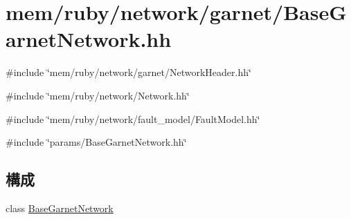 \hypertarget{BaseGarnetNetwork_8hh}{
\section{mem/ruby/network/garnet/BaseGarnetNetwork.hh}
\label{BaseGarnetNetwork_8hh}
}
{\ttfamily \#include \char`\"{}mem/ruby/network/garnet/NetworkHeader.hh\char`\"{}}\par
{\ttfamily \#include \char`\"{}mem/ruby/network/Network.hh\char`\"{}}\par
{\ttfamily \#include \char`\"{}mem/ruby/network/fault\_\-model/FaultModel.hh\char`\"{}}\par
{\ttfamily \#include \char`\"{}params/BaseGarnetNetwork.hh\char`\"{}}\par
\subsection*{構成}
\begin{DoxyCompactItemize}
\item 
class \hyperlink{classBaseGarnetNetwork}{BaseGarnetNetwork}
\end{DoxyCompactItemize}
